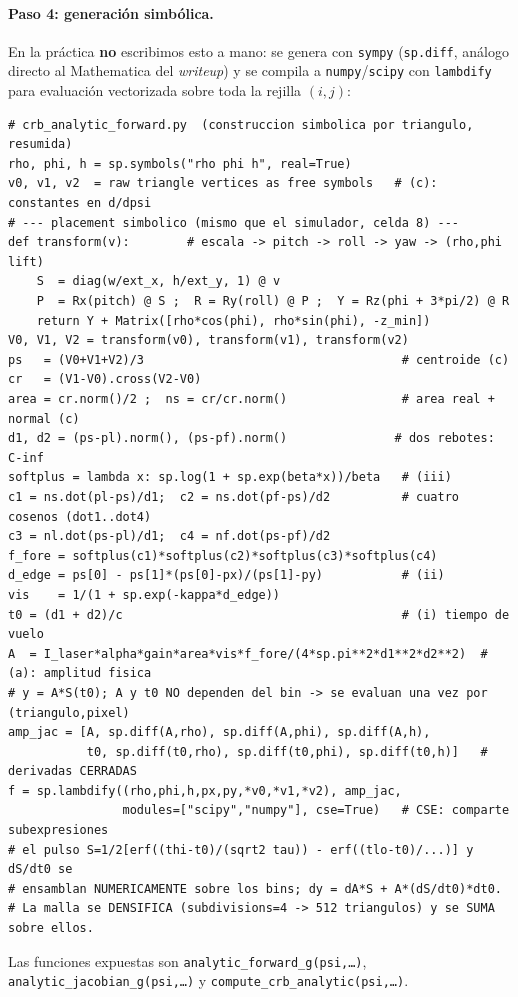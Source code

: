 \documentclass[11pt,a4paper]{article}
\theoremstyle{plain}
\theoremstyle{definition}
\begin{document}
\paragraph{Paso 4: generaci\'on simb\'olica.} En la pr\'actica \textbf{no}
escribimos esto a mano: se genera con \texttt{sympy} (\texttt{sp.diff}, an\'alogo
directo al Mathematica del \emph{writeup}) y se compila a
\texttt{numpy}/\texttt{scipy} con \texttt{lambdify} para evaluaci\'on vectorizada
sobre toda la rejilla $(i,j)$:
\begin{lstlisting}
# crb_analytic_forward.py  (construccion simbolica por triangulo, resumida)
rho, phi, h = sp.symbols("rho phi h", real=True)
v0, v1, v2  = raw triangle vertices as free symbols   # (c): constantes en d/dpsi
# --- placement simbolico (mismo que el simulador, celda 8) ---
def transform(v):        # escala -> pitch -> roll -> yaw -> (rho,phi lift)
    S  = diag(w/ext_x, h/ext_y, 1) @ v
    P  = Rx(pitch) @ S ;  R = Ry(roll) @ P ;  Y = Rz(phi + 3*pi/2) @ R
    return Y + Matrix([rho*cos(phi), rho*sin(phi), -z_min])
V0, V1, V2 = transform(v0), transform(v1), transform(v2)
ps   = (V0+V1+V2)/3                                    # centroide (c)
cr   = (V1-V0).cross(V2-V0)
area = cr.norm()/2 ;  ns = cr/cr.norm()                # area real + normal (c)
d1, d2 = (ps-pl).norm(), (ps-pf).norm()               # dos rebotes: C-inf
softplus = lambda x: sp.log(1 + sp.exp(beta*x))/beta   # (iii)
c1 = ns.dot(pl-ps)/d1;  c2 = ns.dot(pf-ps)/d2          # cuatro cosenos (dot1..dot4)
c3 = nl.dot(ps-pl)/d1;  c4 = nf.dot(ps-pf)/d2
f_fore = softplus(c1)*softplus(c2)*softplus(c3)*softplus(c4)
d_edge = ps[0] - ps[1]*(ps[0]-px)/(ps[1]-py)           # (ii)
vis    = 1/(1 + sp.exp(-kappa*d_edge))
t0 = (d1 + d2)/c                                       # (i) tiempo de vuelo
A  = I_laser*alpha*gain*area*vis*f_fore/(4*sp.pi**2*d1**2*d2**2)  # (a): amplitud fisica
# y = A*S(t0); A y t0 NO dependen del bin -> se evaluan una vez por (triangulo,pixel)
amp_jac = [A, sp.diff(A,rho), sp.diff(A,phi), sp.diff(A,h),
           t0, sp.diff(t0,rho), sp.diff(t0,phi), sp.diff(t0,h)]   # derivadas CERRADAS
f = sp.lambdify((rho,phi,h,px,py,*v0,*v1,*v2), amp_jac,
                modules=["scipy","numpy"], cse=True)   # CSE: comparte subexpresiones
# el pulso S=1/2[erf((thi-t0)/(sqrt2 tau)) - erf((tlo-t0)/...)] y dS/dt0 se
# ensamblan NUMERICAMENTE sobre los bins; dy = dA*S + A*(dS/dt0)*dt0.
# La malla se DENSIFICA (subdivisions=4 -> 512 triangulos) y se SUMA sobre ellos.
\end{lstlisting}
Las funciones expuestas son \texttt{analytic\_forward\_g(psi,\dots)},
\texttt{analytic\_jacobian\_g(psi,\dots)} y \texttt{compute\_crb\_analytic(psi,\dots)}.
\end{document}
